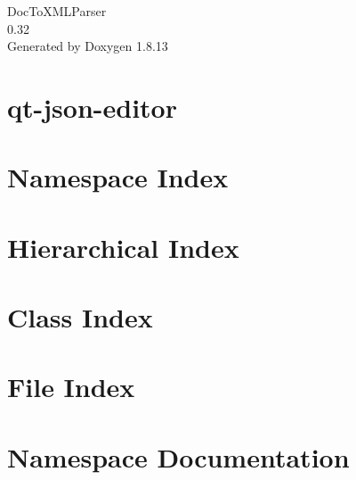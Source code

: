 \documentclass[twoside]{book}
\newcommand{\+}{\discretionary{\mbox{\scriptsize$\hookleftarrow$}}{}{}}
\newcommand{\clearemptydoublepage}{%
  \newpage{\pagestyle{empty}\cleardoublepage}%
}
\begin{document}
\hypersetup{pageanchor=false,
             bookmarksnumbered=true,
             pdfencoding=unicode
            }
\begin{titlepage}
\vspace*{7cm}
\begin{center}%
{\Large Doc\+To\+X\+M\+L\+Parser \\[1ex]\large 0.\+32 }\\
\vspace*{1cm}
{\large Generated by Doxygen 1.8.13}\\
\end{center}
\end{titlepage}
\clearemptydoublepage
{}
\tableofcontents
\clearemptydoublepage
{}
\hypersetup{pageanchor=true}

\chapter{qt-\/json-\/editor}
\label{md_qt-json-editor-master__r_e_a_d_m_e}

\chapter{Namespace Index}

\chapter{Hierarchical Index}

\chapter{Class Index}

\chapter{File Index}

\chapter{Namespace Documentation}


\end{document}
